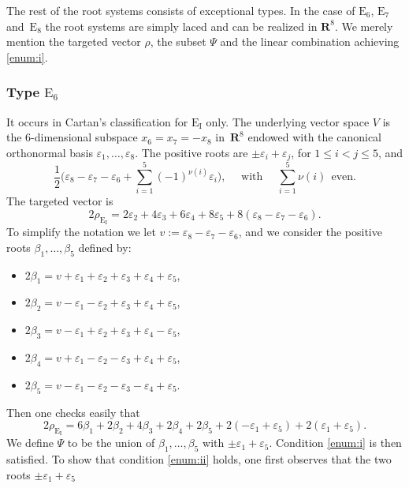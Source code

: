\documentclass[JEP,XML,SOM,Unicode,published]{cedram}
\newcommand{\rI}{\mathrm{I}}
\newcommand{\RR}{\mathbf{R}}
\theoremstyle{plain}
\theoremstyle{remark}
\theoremstyle{definition}
\begin{document}
The rest of the root systems consists of exceptional types.
In the case of $\mathrm{E}_6$, $\mathrm{E}_7$ and~$\mathrm{E}_8$ the root systems are simply laced and can be realized in $\RR^8$.
We merely mention the targeted vector $\rho$, the subset $\Psi$ and the linear combination achieving \eqref{enum:i}.

\subsubsection*{Type $\mathrm{E}_6$
\cite[Planche V, p.\,260]{BBK-Lie-4to6}}
It occurs in Cartan's classification for $\mathrm{E}_\rI$ only. The underlying vector space
$V$ is the $6$-dimensional subspace $x_6 = x_7 = -x_8$ in~$\RR^8$ endowed with the canonical orthonormal basis $\varepsilon_1, \dots , \varepsilon_8$. The positive roots are \hbox{$\pm \varepsilon_i + \varepsilon_j$}, for $1\leqslant i < j \leqslant 5$, and
\[\frac{1}{2}\bigl(\varepsilon_8 - \varepsilon_7 - \varepsilon_6 + \sum_{i=1}^5 (-1)^{\nu (i)} \varepsilon_i \bigr),
~~~\text{~~with~~}~~~ \sum_{i=1}^5 \nu (i)~~\text{even}.\]
The targeted vector is
\[
2 \rho_{\mathrm{E}_\rI} = 2 \varepsilon_2 + 4 \varepsilon_3 + 6 \varepsilon_4 + 8 \varepsilon_5 + 8 (\varepsilon_8 - \varepsilon_7 - \varepsilon_6).
\]
To simplify the notation we let $v:= \varepsilon_8 - \varepsilon_7 - \varepsilon_6$, and we consider the positive roots
$\beta_1, \dots, \beta_5$ defined by:
\begin{itemize}
\item[] $2\beta_1 = v + \varepsilon_1 + \varepsilon_2 + \varepsilon_3 + \varepsilon_4 + \varepsilon_5$,
\item[] $2\beta_2 = v - \varepsilon_1 - \varepsilon_2 + \varepsilon_3 + \varepsilon_4 + \varepsilon_5$,
\item[] $2\beta_3 = v - \varepsilon_1 + \varepsilon_2 + \varepsilon_3 + \varepsilon_4 - \varepsilon_5$,
\item[] $2\beta_4 = v + \varepsilon_1 - \varepsilon_2 - \varepsilon_3 + \varepsilon_4 + \varepsilon_5$,
\item[] $2\beta_5 = v - \varepsilon_1 - \varepsilon_2 - \varepsilon_3 - \varepsilon_4 + \varepsilon_5$.
\end{itemize}
Then one checks easily that
\[2 \rho_{\mathrm{E}_\rI} = 6 \beta_1 + 2 \beta_2 + 4 \beta_3 + 2\beta_4 + 2 \beta_5 + 2(-\varepsilon_1+\varepsilon_5)
+2(\varepsilon_1 + \varepsilon_5).\]
We define $\Psi$ to be the union of $\beta_1, \dots, \beta_5$ with $\pm\varepsilon_1+\varepsilon_5$. Condition \eqref{enum:i}
is then satisfied. To show that condition \eqref{enum:ii} holds, one first observes that the two roots $\pm\varepsilon_1+\varepsilon_5$
\end{document}
